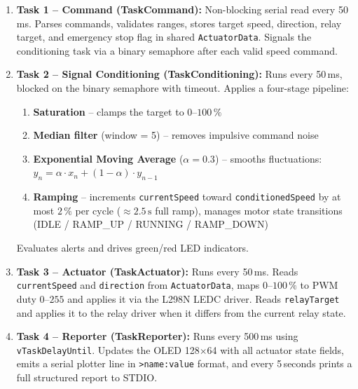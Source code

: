 \begin{enumerate}
  \item \textbf{Task 1 -- Command (TaskCommand):} Non-blocking serial read every 50\,ms.
    Parses commands, validates ranges, stores target speed, direction, relay target, and
    emergency stop flag in shared \texttt{ActuatorData}. Signals the conditioning task via
    a binary semaphore after each valid speed command.

  \item \textbf{Task 2 -- Signal Conditioning (TaskConditioning):} Runs every 50\,ms,
    blocked on the binary semaphore with timeout. Applies a four-stage pipeline:
    \begin{enumerate}
      \item \textbf{Saturation} -- clamps the target to $0$--$100\,\%$
      \item \textbf{Median filter} (window = 5) -- removes impulsive command noise
      \item \textbf{Exponential Moving Average} ($\alpha = 0.3$) -- smooths fluctuations:
        $y_n = \alpha \cdot x_n + (1 - \alpha) \cdot y_{n-1}$
      \item \textbf{Ramping} -- increments \texttt{currentSpeed} toward
        \texttt{conditionedSpeed} by at most $2\,\%$ per cycle ($\approx 2.5\,\mathrm{s}$
        full ramp), manages motor state transitions (IDLE / RAMP\_UP / RUNNING /
        RAMP\_DOWN)
    \end{enumerate}
    Evaluates alerts and drives green/red LED indicators.

  \item \textbf{Task 3 -- Actuator (TaskActuator):} Runs every 50\,ms. Reads
    \texttt{currentSpeed} and \texttt{direction} from \texttt{ActuatorData}, maps
    $0$--$100\,\%$ to PWM duty $0$--$255$ and applies it via the L298N LEDC driver.
    Reads \texttt{relayTarget} and applies it to the relay driver when it differs from
    the current relay state.

  \item \textbf{Task 4 -- Reporter (TaskReporter):} Runs every 500\,ms using
    \texttt{vTaskDelayUntil}. Updates the OLED 128$\times$64 with all actuator state
    fields, emits a serial plotter line in \texttt{>name:value} format, and every
    5\,seconds prints a full structured report to STDIO.
\end{enumerate}
